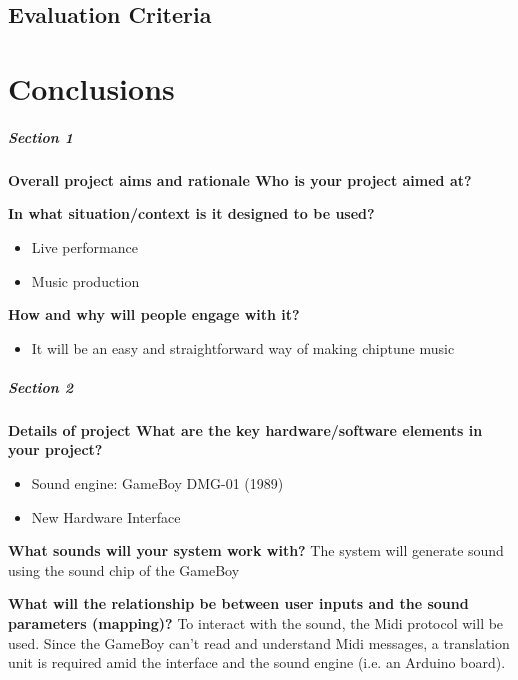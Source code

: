 \documentclass[]{article}
\begin{document}
    \subsection{Evaluation Criteria}

\section{Conclusions}







\subparagraph[]{Section 1}
    \textbf{Overall project aims and rationale Who is your project aimed at?}

    \textbf{In what situation/context is it designed to be used?}
    
        \begin{itemize}
        \item Live performance
        \item Music production
        \end{itemize}

    \textbf{How and why will people engage with it?}

        \begin{itemize}
        \item It will be an easy and straightforward way of making chiptune music
        \end{itemize}

\subparagraph[]{Section 2}

    \textbf{Details of project What are the key hardware/software elements in your
    project?}

        \begin{itemize}
            \item Sound engine: GameBoy DMG-01 (1989)
            \item New Hardware Interface
        \end{itemize}

    \textbf{What sounds will your system work with?}
    The system will generate sound using the sound chip of the GameBoy

    \textbf{What will the relationship be between user inputs and the sound 
    parameters (mapping)?} 
    To interact with the sound, the Midi protocol will be used.
    Since the GameBoy can't read and understand Midi messages,
    a translation unit is required amid the interface and the sound engine (i.e. an Arduino board).
\end{document}
